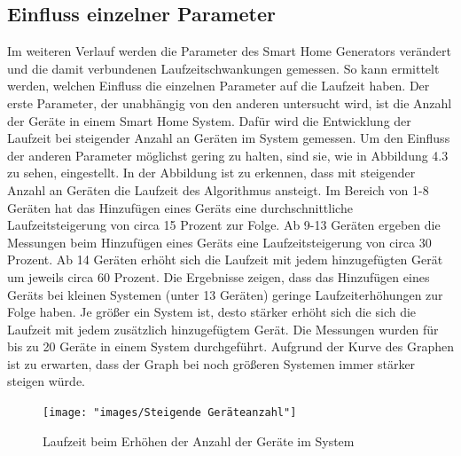\subsection{Einfluss einzelner Parameter}
Im weiteren Verlauf werden die Parameter des Smart Home Generators verändert und die damit verbundenen Laufzeitschwankungen gemessen. So kann ermittelt werden,
welchen Einfluss die einzelnen Parameter auf die Laufzeit haben. Der erste Parameter, der unabhängig von den anderen untersucht wird,
ist die Anzahl der Geräte in einem Smart Home System. 
Dafür wird die Entwicklung der Laufzeit bei steigender Anzahl an Geräten im System gemessen. Um den Einfluss der anderen Parameter möglichst gering zu halten,
sind sie, wie in Abbildung 4.3 zu sehen, eingestellt.
In der Abbildung ist zu erkennen, dass mit steigender Anzahl an Geräten die Laufzeit des
Algorithmus ansteigt. Im Bereich von 1-8 Geräten hat das Hinzufügen eines Geräts eine durchschnittliche Laufzeitsteigerung von circa 15 Prozent zur Folge. Ab 9-13 Geräten
ergeben die Messungen beim Hinzufügen eines Geräts eine Laufzeitsteigerung von circa 30 Prozent. Ab 14 Geräten erhöht sich die Laufzeit mit jedem hinzugefügten
Gerät um jeweils circa 60 Prozent. Die Ergebnisse zeigen, dass das Hinzufügen eines Geräts bei kleinen Systemen (unter 13 Geräten) geringe Laufzeiterhöhungen zur Folge haben.
Je größer ein System ist, desto stärker erhöht sich die sich die Laufzeit mit jedem zusätzlich hinzugefügtem Gerät. Die Messungen wurden für bis zu 20 Geräte in einem
System durchgeführt. Aufgrund der Kurve des Graphen ist zu erwarten, dass der Graph bei noch größeren Systemen immer stärker steigen würde.
\begin{figure}[h]
\begin{center}
\texttt{[image: "images/Steigende Geräteanzahl"]}
\caption{Laufzeit beim Erhöhen der Anzahl der Geräte im System}
\label{fig:Prob1:MEA}
\end{center}
\end{figure}

